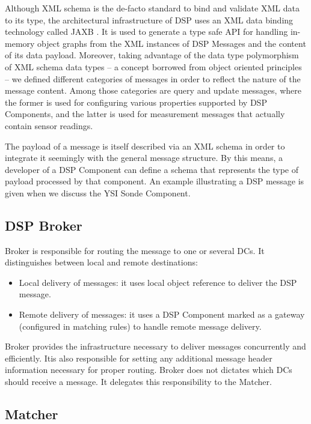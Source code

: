 \documentclass[conference]{IEEEtran}
\begin{document}
Although XML schema is the de-facto standard to bind and validate XML
data to its type, the architectural infrastructure of DSP uses an XML
data binding technology \cite{xml-dbind} called JAXB \cite{xml-jaxb}.
It is used to generate a type safe API for handling in-memory object
graphs from the XML instances of DSP Messages and the content of its
data payload. Moreover, taking advantage of the data type polymorphism
of XML schema data types -- a concept borrowed from object oriented
principles -- we defined different categories of messages in order to
reflect the nature of the message content. Among those categories are
query and update messages, where the former is used for configuring various
properties supported by DSP Components, and the latter is used for measurement
messages that actually contain sensor readings.

The payload of a message is itself described via an XML schema in
order to integrate it seemingly with the general message structure. By this
means, a developer of a DSP Component can define a schema that represents the
type of payload processed by that component. An example illustrating a DSP
message is given when we discuss the YSI Sonde Component.

\subsection{DSP Broker}
Broker is responsible for routing the message to one or several DCs. It
distinguishes between local and remote destinations:

\begin{itemize}
\item Local delivery of messages: it uses local object reference to
  deliver the DSP message.
\item Remote delivery of messages: it uses a DSP Component marked as a
  gateway (configured in matching rules) to handle remote message delivery.
\end{itemize}

Broker provides the infrastructure necessary to deliver messages concurrently and
efficiently. Itis  also responsible for setting any additional message header 
information necessary for proper routing. Broker does not dictates which DCs should
receive a message. It delegates this responsibility to the Matcher.

\subsection{Matcher}
\end{document}
